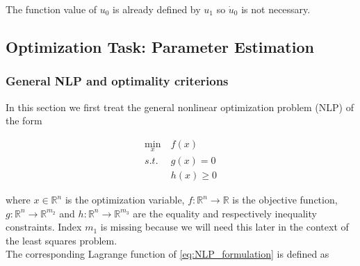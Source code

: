 \documentclass{scrartcl}[12pt, halfparskip]
\newcommand{\todo}[1]{\textcolor{red}{TODO: #1}}
\begin{document}
The function value of $u_0$ is already defined by $u_1$ so $\dot{u}_0$ is not necessary.




\subsection{Optimization Task: Parameter Estimation}
%
%

\subsubsection{General NLP and optimality criterions}
In this section we first treat the general nonlinear optimization problem (NLP) of the form

\begin{align}
	\min_x & \ f(x) \label{eq:NLP_formulation} \\
	s.t. & \ g(x) = 0 \nonumber \\
	& \ h(x) \ge 0 \nonumber
\end{align}

where $x \in \mathbb{R}^n$ is the optimization variable, $f: \mathbb{R}^n \rightarrow \mathbb{R}$ is the objective function, $g: \mathbb{R}^n \rightarrow \mathbb{R}^{m_2}$ and $h: \mathbb{R}^n \rightarrow \mathbb{R}^{m_3}$ are the equality and respectively inequality constraints. Index $m_1$ is missing because we will need this later in the context of the least squares problem. \\
The corresponding Lagrange function of \eqref{eq:NLP_formulation} is defined as
\end{document}
